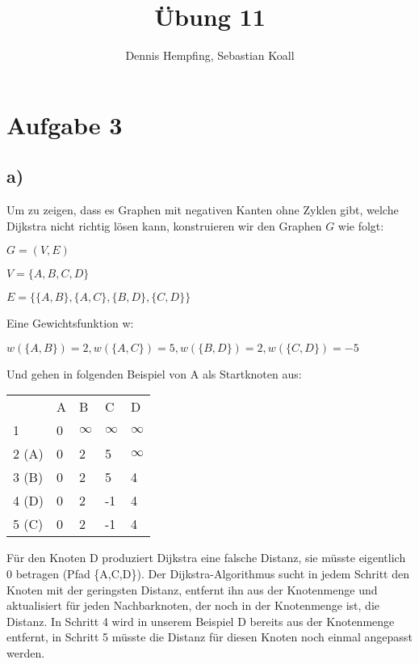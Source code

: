 \documentclass[12pt]{scrartcl}%
\theoremstyle{nonumberplain}
\begin{document}
\author{Dennis Hempfing, Sebastian Koall}
\title{Übung 11}
\date{} 
\pagestyle{myheadings}

\maketitle %

\section*{Aufgabe 3}

\subsection*{a)}
Um zu zeigen, dass es Graphen mit negativen Kanten ohne Zyklen gibt, welche Dijkstra nicht richtig lösen kann, konstruieren wir den Graphen $G$ wie folgt:
\vspace{0.1cm}

$G=(V,E)$

$V=\{A,B,C,D\}$

$E=\{\{A,B\},\{A,C\},\{B,D\},\{C,D\}\}$

\vspace{0.3cm}
Eine Gewichtsfunktion w:
\vspace{0.1cm}

$w(\{A,B\})=2, w(\{A,C\})=5, w(\{B,D\})=2, w(\{C,D\})=-5 $

\vspace{0.4cm}
Und gehen in folgenden Beispiel von A als Startknoten aus:
\vspace{0.1cm}

\begin{tabular}{p{1cm}p{2cm}p{2cm}p{2cm}l}
	  & A & B & C & D\\
	1 & 0 & $\infty$ & $\infty$ & $\infty$\\
	2 (A) & 0 & 2 & 5 & $\infty$\\
	3 (B) & 0 & 2 & 5 & 4\\
	4 (D) & 0 & 2 & -1 & 4\\
	5 (C) & 0 & 2 & -1 & 4\\
\end{tabular}
\vspace{0.4cm}

Für den Knoten D produziert Dijkstra eine falsche Distanz, sie müsste eigentlich 0 betragen (Pfad \{A,C,D\}). Der Dijkstra-Algorithmus sucht in jedem Schritt den Knoten mit der geringsten Distanz, entfernt ihn aus der Knotenmenge und aktualisiert für jeden Nachbarknoten, der noch in der Knotenmenge ist, die Distanz. In Schritt 4 wird in unserem Beispiel D bereits aus der Knotenmenge entfernt, in Schritt 5 müsste die Distanz für diesen Knoten noch einmal angepasst werden.
\end{document}
